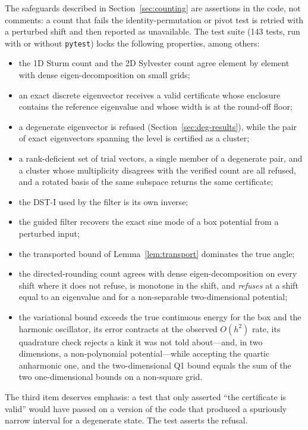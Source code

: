 The safeguards described in Section~\ref{sec:counting} are assertions in the
code, not comments: a count that fails the identity-permutation or pivot test
is retried with a perturbed shift and then reported as unavailable. The test
suite (143 tests, run with or without \texttt{pytest}) locks the following
properties, among others:
\begin{itemize}
\item the 1D Sturm count and the 2D Sylvester count agree element by element
  with dense eigen-decomposition on small grids;
\item an exact discrete eigenvector receives a valid certificate whose
  enclosure contains the reference eigenvalue and whose width is at the
  round-off floor;
\item a degenerate eigenvector is refused (Section~\ref{sec:deg-results}),
  while the pair of exact eigenvectors spanning the level is certified as a
  cluster;
\item a rank-deficient set of trial vectors, a single member of a degenerate
  pair, and a cluster whose multiplicity disagrees with the verified count are
  all refused, and a rotated basis of the same subspace returns the same
  certificate;
\item the DST-I used by the filter is its own inverse;
\item the guided filter recovers the exact sine mode of a box potential from a
  perturbed input;
\item the transported bound of Lemma~\ref{lem:transport} dominates the true
  angle;
\item the directed-rounding count agrees with dense eigen-decomposition on
  every shift where it does not refuse, is monotone in the shift, and
  \emph{refuses} at a shift equal to an eigenvalue and for a non-separable
  two-dimensional potential;
\item the variational bound exceeds the true continuous energy for the box
  and the harmonic oscillator, its error contracts at the observed $O(h^2)$
  rate, its quadrature check rejects a kink it was not told about---and, in
  two dimensions, a non-polynomial potential---while accepting the quartic
  anharmonic one, and the two-dimensional Q1 bound equals the sum of the two
  one-dimensional bounds on a non-square grid.
\end{itemize}
The third item deserves emphasis: a test that only asserted ``the certificate
is valid'' would have passed on a version of the code that produced a
spuriously narrow interval for a degenerate state. The test asserts the
refusal.
